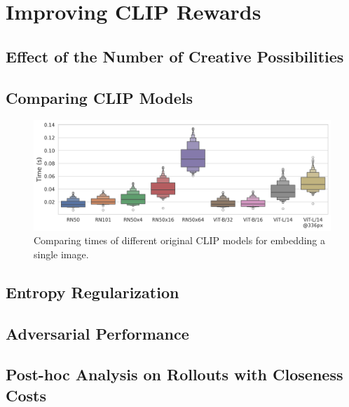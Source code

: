 \section{Improving CLIP Rewards}
\label{sec:improving-rewards}

\subsection{Effect of the Number of Creative Possibilities}
\label{sec:clip-categories}


\subsection{Comparing CLIP Models}
\label{sec:clip-comparison}

\begin{figure}[h]
    \centering
    \includegraphics[width=\textwidth]{images/clip_inference_times.png}
    \caption{Comparing times of different original CLIP models for embedding a single image.}
    \label{fig:clip-comparison}
\end{figure}


\subsection{Entropy Regularization}
\label{sec:entropy-regularization}


\subsection{Adversarial Performance}
\label{sec:adversarial-performance}


\subsection{Post-hoc Analysis on Rollouts with Closeness Costs}
\label{sec:closeness-rollouts}

